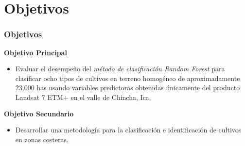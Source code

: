 \section{Objetivos}


\begin{frame}
	\frametitle{Objetivos}
	\textbf{Objetivo Principal}
	\begin{itemize}
		\item Evaluar el desempeño del  \textit{método de clasificación Random Forest} para clasificar ocho tipos de cultivos en terreno homogéneo de aproximadamente 23,000 has usando variables predictoras obtenidas únicamente del producto Landsat 7 ETM+ en el valle de Chincha, Ica.
	\end{itemize}
	
	\textbf{Objetivo Secundario}
	\begin{itemize} 
		\item Desarrollar una metodología para la clasificación e identificación de cultivos en zonas costeras. 
	\end{itemize}

\end{frame}

